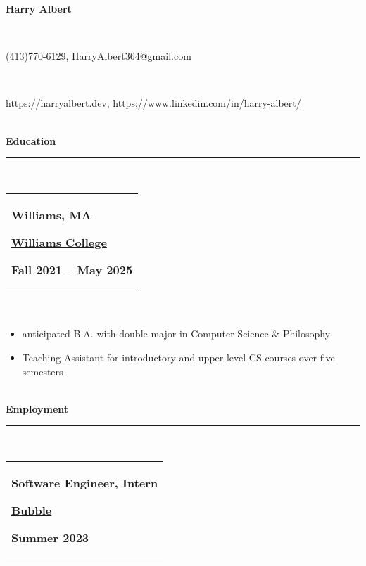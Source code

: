\documentclass[10pt]{extarticle}
\begin{document}
\thispagestyle{empty}
\vspace{-\baselineskip}
\begin{center}
\Large \textbf{Harry Albert }
\end{center}
\vspace{-6.5ex}~\\ 
\vspace{-\baselineskip}
\begin{center}
\normalsize (413)770-6129, HarryAlbert364@gmail.com 
\end{center}
\vspace{-6ex}~\\ 
\vspace{-\baselineskip}
\begin{center}
\normalsize \url{https://harryalbert.dev}, \url{https://www.linkedin.com/in/harry-albert/}
\end{center}
\vspace{-6ex}~\\ 
\textbf{Education }\\[-2ex]
\rule{\textwidth}{0.4pt}\\ 
\begin{tabular}{@{}p{\textwidth}}\begin{minipage}[t]{0.333\textwidth}
\raggedright
\textbf{Williams, MA}
\end{minipage}%
\begin{minipage}[t]{0.333\textwidth}
\centering
\textbf{\underline{Williams College}}
\end{minipage}%
\begin{minipage}[t]{0.333\textwidth}
\raggedleft
\textbf{Fall 2021 – May 2025}
\end{minipage}%
\end{tabular}\\[0.5ex]
\vspace{-\baselineskip}
\begin{itemize}[noitemsep,nolistsep]
\item anticipated B.A. with double major in Computer Science \& Philosophy 
\item Teaching Assistant for introductory and upper-level CS courses over five semesters 
\end{itemize}~\\[-1ex]
\textbf{Employment}\\[-2ex]
\rule{\textwidth}{0.4pt}\\ 
\begin{tabular}{@{}p{\textwidth}}\begin{minipage}[t]{0.333\textwidth}
\raggedright
\textbf{Software Engineer, Intern}
\end{minipage}%
\begin{minipage}[t]{0.333\textwidth}
\centering
\textbf{\underline{Bubble}}
\end{minipage}%
\begin{minipage}[t]{0.333\textwidth}
\raggedleft
\textbf{Summer 2023}
\end{minipage}%
\end{tabular}\\[0.5ex]
\end{document}
